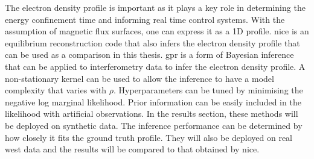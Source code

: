 The electron density profile is important as it plays a key role in determining the energy confinement time and informing real time control systems. With the assumption of magnetic flux surfaces, one can express it as a 1D profile. \gls{nice} is an equilibrium reconstruction code that also infers the electron density profile that can be used as a comparison in this thesis. \gls{gpr} is a form of Bayesian inference that can be applied to interferometry data to infer the electron density profile. A non-stationary kernel can be used to allow the inference to have a model complexity that varies with $\rho$. Hyperparameters can be tuned by minimising the negative log marginal likelihood. Prior information can be easily included in the likelihood with artificial observations. In the results section, these methods will be deployed on synthetic data. The inference performance can be determined by how closely it fits the ground truth profile. They will also be deployed on real \gls{west} data and the results will be compared to that obtained by \gls{nice}.



